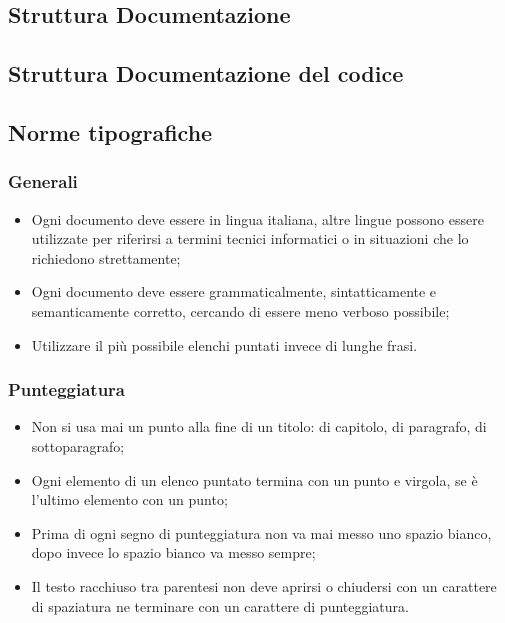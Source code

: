 \subsection{Struttura Documentazione}
\subsection{Struttura Documentazione del codice}
\subsection{Norme tipografiche}
\subsubsection{Generali}
\begin{itemize}
\item Ogni documento deve essere in lingua italiana, altre lingue possono essere utilizzate per riferirsi a termini tecnici informatici o in situazioni che lo richiedono strettamente;

\item Ogni documento deve essere grammaticalmente, sintatticamente e semanticamente corretto, cercando di essere meno verboso possibile;

\item Utilizzare il più possibile elenchi puntati invece di lunghe frasi.

\end{itemize}
\subsubsection{Punteggiatura}
\begin{itemize}
\item Non si usa mai un punto alla fine di un titolo: di capitolo, di paragrafo, di sottoparagrafo;

\item Ogni elemento di un elenco puntato termina con un punto e virgola, se è l'ultimo elemento con un punto;

\item Prima di ogni segno di punteggiatura non va mai messo uno spazio bianco, dopo invece lo spazio bianco va messo sempre;

\item Il testo racchiuso tra parentesi non deve aprirsi o chiudersi con un carattere di spaziatura ne terminare con un carattere di punteggiatura.

\end{itemize}
